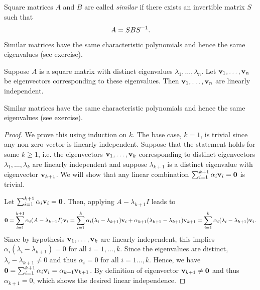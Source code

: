\documentclass{article}
\begin{document}
\begin{definition}
Square matrices $A$ and $B$ are called \emph{similar} if there exists an invertible matrix $S$ such that
$$A = SBS^{-1}.$$
\end{definition}

Similar matrices have the same characteristic polynomials and hence the same eigenvalues (see exercise).

\begin{theorem}
Suppose $A$ is a square matrix with distinct eigenvalues $\lambda_1, \ldots, \lambda_n$. Let ${\mathbf{v}}_1, \ldots, {\mathbf{v}}_n$ be eigenvectors corresponding to these eigenvalues. Then ${\mathbf{v}}_1, \ldots, {\mathbf{v}}_n$ are linearly independent.
\end{theorem}

Similar matrices have the same characteristic polynomials and hence the same eigenvalues (see exercise).

\begin{proof}
We prove this using induction on $k$. The base case, $k=1$, is trivial since any non-zero vector is linearly independent. 
Suppose that the statement holds for some $k \geq 1$, i.e. the eigenvectors ${\mathbf{v}}_1, \ldots, {\mathbf{v}}_k$ corresponding to distinct eigenvectors $\lambda_1, \ldots, \lambda_k$ are linearly independent and suppose $\lambda_{k+1}$ is a distinct eigenvalue with eigenvector ${\mathbf{v}}_{k+1}$. We will show that any linear combination $\sum_{i=1}^{k+1} \alpha_i {\mathbf{v}}_i = {\mathbf{0}}$ is trivial.

Let $\sum_{i=1}^{k+1} \alpha_i {\mathbf{v}}_i = {\mathbf{0}}$. Then, applying $A-\lambda_{k+1} I$ leads to 
\begin{align*}
    {\mathbf{0}} = \sum_{i=1}^{k+1} \alpha_i (A-\lambda_{k+1} I){\mathbf{v}}_i = \sum_{i=1}^{k} \alpha_i (\lambda_i-\lambda_{k+1}){\mathbf{v}}_i  + \alpha_{k+1} (\lambda_{k+1}-\lambda_{k+1}){\mathbf{v}}_{k+1} = \sum_{i=1}^{k} \alpha_i (\lambda_i-\lambda_{k+1}){\mathbf{v}}_i.
\end{align*}
Since by hypothesis ${\mathbf{v}}_1, \ldots, {\mathbf{v}}_k$ are linearly independent, this implies $\alpha_i (\lambda_i-\lambda_{k+1}) = 0$ for all $i=1,\ldots, k$. Since the eigenvalues are distinct, $\lambda_i-\lambda_{k+1} \neq 0$ and thus $\alpha_i = 0$ for all $i = 1\ldots, k$. Hence, we have ${\mathbf{0}} = \sum_{i=1}^{k+1} \alpha_i {\mathbf{v}}_i = \alpha_{k+1} {\mathbf{v}}_{k+1}$. By definition of eigenvector ${\mathbf{v}}_{k+1} \neq {\mathbf{0}}$ and thus $\alpha_{k+1} = 0$, which shows the desired linear independence.

\end{proof}
\end{document}
